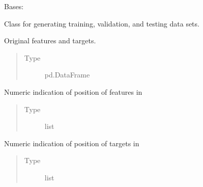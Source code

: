 \documentclass[letterpaper,10pt,english]{sphinxmanual}
\begin{document}
\begin{fulllineitems}
\label{\detokenize{api/ucf.TrainingDataSets:ucf.TrainingDataSets}}
Bases: 

Class for generating training, validation, and testing data sets.

\begin{fulllineitems}
\label{\detokenize{api/ucf.TrainingDataSets:ucf.TrainingDataSets.original_data}}
Original features and targets.
\begin{quote}\begin{description}
\item[{Type}] \leavevmode
pd.DataFrame

\end{description}\end{quote}

\end{fulllineitems}


\begin{fulllineitems}
\label{\detokenize{api/ucf.TrainingDataSets:ucf.TrainingDataSets.indices_of_features}}
Numeric indication of position of features in 
\begin{quote}\begin{description}
\item[{Type}] \leavevmode
list

\end{description}\end{quote}

\end{fulllineitems}


\begin{fulllineitems}
\label{\detokenize{api/ucf.TrainingDataSets:ucf.TrainingDataSets.indices_of_targets}}
Numeric indication of position of targets in 
\begin{quote}\begin{description}
\item[{Type}] \leavevmode
list


\end{description}
\end{quote}
\end{fulllineitems}
\end{fulllineitems}
\end{document}
